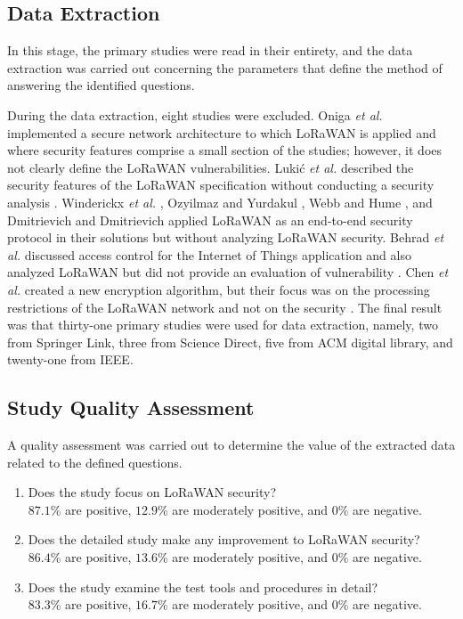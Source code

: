 \documentclass[manuscript,screen,review=false]{acmart}
\begin{document}
\subsection{Data Extraction}

In this stage, the primary studies were read in their entirety, and the data extraction was carried out concerning the parameters that define the method of answering the identified questions.

During the data extraction, eight studies were excluded. Oniga {\it et al.} \cite{36_secure_lorawan_sensor_networks} implemented a secure network architecture to which LoRaWAN is applied and where security features comprise a small section of the studies; however, it does not clearly define the LoRaWAN vulnerabilities. Luki{\'c} {\it et al.} described the security features of the LoRaWAN specification without conducting a security analysis \cite{53_dataflow_IoT_application} . Winderickx {\it et al.} \cite{65_endtoend_secured_comm}, Ozyilmaz and Yurdakul \cite{66_blockchain_swarm_LoRa}, Webb and Hume \cite{69_NIST_IoT}, and Dmitrievich and Dmitrievich \cite{81_Integration_LPWAN} applied LoRaWAN as an end-to-end security protocol in their solutions but without analyzing LoRaWAN security. Behrad {\it et al.} discussed access control for the Internet of Things application and also analyzed LoRaWAN but did not provide an evaluation of vulnerability \cite{78_network_access_control}. Chen {\it  {\it et al.} } created a new encryption algorithm, but their focus was on the processing restrictions of the LoRaWAN network and not on the security \cite{121_sessin_key_generation}. The final result was that thirty-one primary studies were used for data extraction, namely, two from Springer Link, three from Science Direct, five from ACM digital library, and twenty-one from IEEE.

\subsection{Study Quality Assessment}

A quality assessment was carried out to determine the value of the extracted data related to the defined questions.
\begin{enumerate}
  \item Does the study focus on LoRaWAN security? \\
  $87.1$\% are positive, $12.9$\% are moderately positive, and $0$\% are negative.
   
  \item Does the detailed study make any improvement to LoRaWAN security? \\
  $86.4$\% are positive, $13.6$\% are moderately positive, and $0$\% are negative.
   
  \item Does the study examine the test tools and procedures in detail? \\
  $83.3$\% are positive, $16.7$\% are moderately positive, and 0\% are negative.
\end{enumerate}
\end{document}
